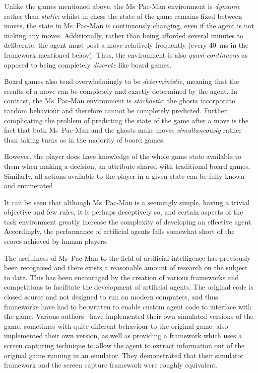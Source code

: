 Unlike the games mentioned above, the Ms~Pac-Man environment is \emph{dynamic} rather than \emph{static}: whilst in chess the state of the game remains fixed between moves, the state in Ms~Pac-Man is continuously changing, even if the agent is not making any moves.  Additionally, rather than being afforded several minutes to deliberate, the agent must post a move relatively frequently (every 40~ms in the framework mentioned below).  Thus, the environment is also \emph{quasi-continuous} as opposed to being completely \emph{discrete} like board games.

Board games also tend overwhelmingly to be \emph{deterministic}, meaning that the results of a move can be completely and exactly determined by the agent.  In contrast, the Ms~Pac-Man environment is \emph{stochastic}: the ghosts incorporate random behaviour and therefore cannot be completely predicted.  Further complicating the problem of predicting the state of the game after a move is the fact that both Ms~Pac-Man and the ghosts make moves \emph{simultaneously} rather than taking turns as in the majority of board games.

However, the player does have knowledge of the whole game state available to them when making a decision, an attribute shared with traditional board games.  Similarly, all actions available to the player in a given state can be fully known and enumerated.

It can be seen that although Ms~Pac-Man is a seemingly simple, having a trivial objective and few rules, it is perhaps deceptively so, and certain aspects of the task environment greatly increase the complexity of developing an effective agent.  Accordingly, the performance of artificial agents falls somewhat short of the scores achieved by human players.

The usefulness of Ms~Pac-Man to the field of artificial intelligence has previously been recognised and there exists a reasonable amount of research on the subject to date.  This has been encouraged by the creation of various frameworks and competitions to facilitate the development of artificial agents.  The original code is closed source and not designed to run on modern computers, and thus frameworks have had to be written to enable custom agent code to interface with the game.  Various authors~\citep{Lucas2005,Koza1992} have implemented their own simulated versions of the game, sometimes with quite different behaviour to the original game. \citet{Robles2009} also implemented their own version, as well as providing a framework which uses a screen capturing technique to allow the agent to extract information out of the original game running in an emulator.  They demonstrated that their simulator framework and the screen capture framework were roughly equivalent.

